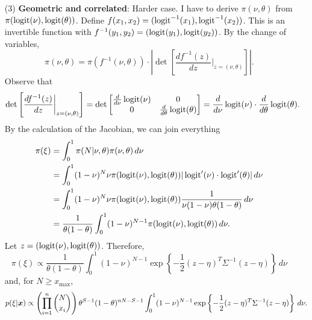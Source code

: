 \begin{enumerate}
    \item[(3)]  {\bf Geometric and correlated}: Harder case. I
    have to derive $\pi(\nu,\theta)$ from $\pi(\operatorname{logit}(\nu), \operatorname{logit}(\theta))$.
    Define $f(x_1,x_2) = (\operatorname{logit}^{-1}(x_1), \operatorname{logit}^{-1}(x_2))$. This is an
    invertible function with $f^{-1}(y_1,y_2) = (\operatorname{logit}(y_1), \operatorname{logit}(y_2))$. By
    the change of variables, 
    $$
    \pi(\nu,\theta) = \pi(f^{-1}(\nu, \theta))\cdot\left|\det \left[\frac{df^{-1}(z)}{dz}\bigg|_{z=(\nu,\theta)}\right]\right|.
    $$
    Observe that 
    $$
    \det \left[\frac{df^{-1}(z)}{dz}\bigg|_{z=(\nu,\theta)}\right] = \det \begin{bmatrix}
        \frac{d}{d\nu}\operatorname{logit}(\nu) & 0 \\
        0 & \frac{d}{d\theta}\operatorname{logit}(\theta)
    \end{bmatrix} = \frac{d}{d\nu}\operatorname{logit}(\nu) \cdot \frac{d}{d\theta}\operatorname{logit}(\theta).
    $$
    By the calculation of the Jacobian, we can join everything
    \begin{equation*}
        \begin{split}
            \pi(\xi) &= \int_0^{1} \pi(N|\nu,\theta)\pi(\nu,\theta) \, d\nu  \\
            &= \int_0^1 (1-\nu)^N\nu \pi(\operatorname{logit}(\nu), \operatorname{logit}(\theta))|\operatorname{logit} '(\nu) \cdot \operatorname{logit} '(\theta)| \, d\nu \\
            &= \int_0^1 (1-\nu)^N\nu \pi(\operatorname{logit}(\nu), \operatorname{logit}(\theta))\frac{1}{\nu(1-\nu)\theta(1-\theta)}\, d\nu \\ 
            &= \frac{1}{\theta(1-\theta)}\int_0^1 (1-\nu)^{N-1}\pi(\operatorname{logit}(\nu), \operatorname{logit}(\theta)) \, d\nu . \\
        \end{split}
    \end{equation*} 
    Let $z = (\operatorname{logit}(\nu), \operatorname{logit}(\theta))$. Therefore, 
    \begin{equation}
        \label{eq:prior-geom-corr}
        \pi(\xi) \propto \frac{1}{\theta(1-\theta)}\int_0^1 (1-\nu)^{N-1}\exp\left\{-\frac{1}{2}(z - \eta)^T\Sigma^{-1}(z-\eta)\right\} \, d\nu
    \end{equation}
    and, for $N \ge x_{\max}$, 
    \begin{equation}
        \label{eq:posterior-geom-corr}
        p(\xi|\boldsymbol{x}) \propto \left(\prod_{i=1}^n \binom{N}{x_i}\right)\theta^{S-1}(1 - \theta)^{nN - S-1}\int_0^1 (1-\nu)^{N-1}\exp\left\{-\frac{1}{2}(z - \eta)^T\Sigma^{-1}(z-\eta)\right\} \, d\nu.
    \end{equation}

\end{enumerate}

\vspace{2ex}